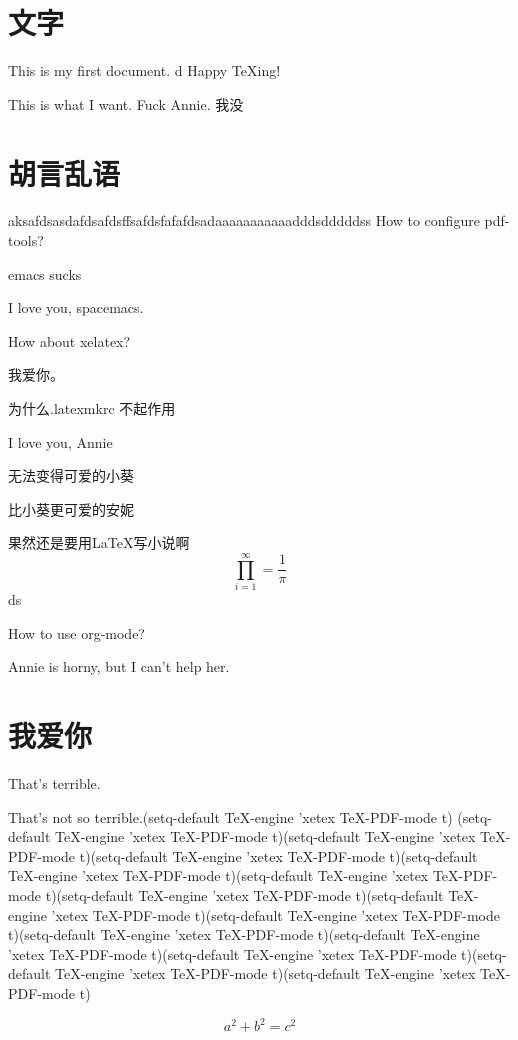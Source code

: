 \documentclass[UTF8]{ctexart}
\begin{document}
\section{文字}
This is my first document.
d
Happy \TeX ing!


This is what I want.
Fuck Annie.
我没 

\section{胡言乱语}

aksafdsasdafdsafdsffsafdsfafafdsadaaaaaaaaaaadddsdddddss
How to configure pdf-tools?

emacs sucks

I love you, spacemacs.


How about xelatex?

我爱你。

为什么.latexmkrc 不起作用

I love you, Annie

无法变得可爱的小葵

比小葵更可爱的安妮

果然还是要用\LaTeX 写小说啊 \\

\begin{equation}
  \prod_{i=1}^{\infty}=\frac{1}{\pi}
  \end{equation}
  ds

How to use org-mode?

Annie is horny, but I can't help her.






\section{我爱你}
That's terrible.

That's not so terrible.(setq-default TeX-engine 'xetex
              TeX-PDF-mode t)
(setq-default TeX-engine 'xetex
              TeX-PDF-mode t)(setq-default TeX-engine 'xetex
              TeX-PDF-mode t)(setq-default TeX-engine 'xetex
              TeX-PDF-mode t)(setq-default TeX-engine 'xetex
              TeX-PDF-mode t)(setq-default TeX-engine 'xetex
              TeX-PDF-mode t)(setq-default TeX-engine 'xetex
              TeX-PDF-mode t)(setq-default TeX-engine 'xetex
              TeX-PDF-mode t)(setq-default TeX-engine 'xetex
              TeX-PDF-mode t)(setq-default TeX-engine 'xetex
              TeX-PDF-mode t)(setq-default TeX-engine 'xetex
              TeX-PDF-mode t)(setq-default TeX-engine 'xetex
              TeX-PDF-mode t)(setq-default TeX-engine 'xetex
              TeX-PDF-mode t)(setq-default TeX-engine 'xetex
              TeX-PDF-mode t)

\begin{equation}
\label{eq:2}
a^{2}+b^{2}=c^{2}
\end{equation}
\end{document}
